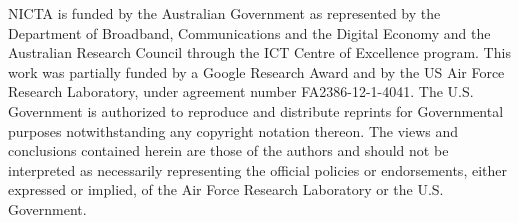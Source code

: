 NICTA is funded by the Australian Government as represented by
the Department of Broadband, Communications and the Digital Economy
and the Australian Research Council through the ICT Centre of
Excellence program.  
%
This work was partially funded by a Google
Research Award and by the US Air Force Research Laboratory, under
agreement number FA2386-12-1-4041. The U.S.  Government is authorized
to reproduce and distribute reprints for Governmental purposes
notwithstanding any copyright notation thereon. The views and
conclusions contained herein are those of the authors and should not
be interpreted as necessarily representing the official policies or
endorsements, either expressed or implied, of the Air Force Research
Laboratory or the U.S. Government.  
